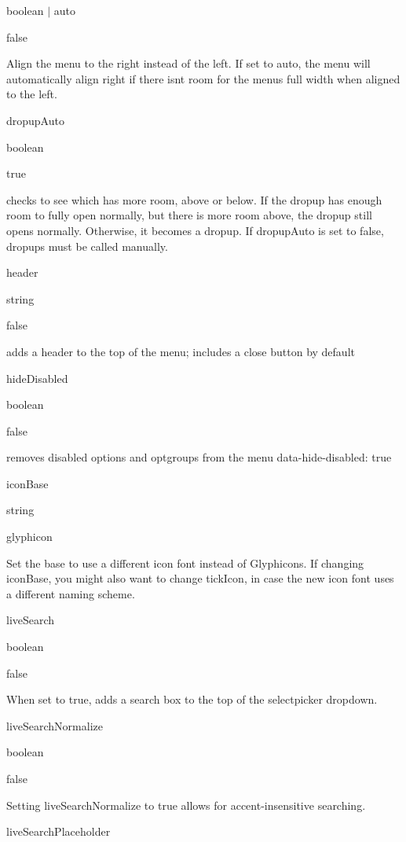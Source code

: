 boolean $\vert$ {\ttfamily \textquotesingle{}auto\textquotesingle{}} 

{\ttfamily false} 

Align the menu to the right instead of the left. If set to {\ttfamily \textquotesingle{}auto\textquotesingle{}}, the menu will automatically align right if there isn\textquotesingle{}t room for the menu\textquotesingle{}s full width when aligned to the left.

dropup\+Auto 

boolean 

{\ttfamily true} 

checks to see which has more room, above or below. If the dropup has enough room to fully open normally, but there is more room above, the dropup still opens normally. Otherwise, it becomes a dropup. If dropup\+Auto is set to false, dropups must be called manually.

header 

string 

{\ttfamily false} 

adds a header to the top of the menu; includes a close button by default

hide\+Disabled 

boolean 

{\ttfamily false} 

removes disabled options and optgroups from the menu {\ttfamily data-\/hide-\/disabled\+: true}

icon\+Base 

string 

{\ttfamily \textquotesingle{}glyphicon\textquotesingle{}} 

Set the base to use a different icon font instead of Glyphicons. If changing icon\+Base, you might also want to change {\ttfamily tick\+Icon}, in case the new icon font uses a different naming scheme.

live\+Search 

boolean 

{\ttfamily false} 

When set to {\ttfamily true}, adds a search box to the top of the selectpicker dropdown.

live\+Search\+Normalize 

boolean 

{\ttfamily false} 

Setting live\+Search\+Normalize to {\ttfamily true} allows for accent-\/insensitive searching.

live\+Search\+Placeholder 

